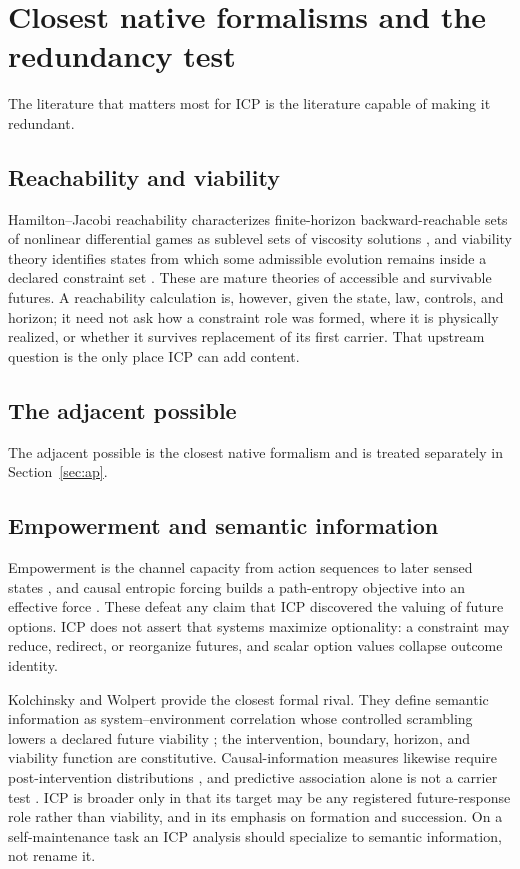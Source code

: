 \section{Closest native formalisms and the redundancy test}
\label{sec:redundancy}

The literature that matters most for ICP is the literature capable of making
it redundant.

\subsection{Reachability and viability}

Hamilton--Jacobi reachability characterizes finite-horizon backward-reachable
sets of nonlinear differential games as sublevel sets of viscosity solutions
\citep{MitchellEtAl2005Reachable}, and viability theory identifies states from
which some admissible evolution remains inside a declared constraint set
\citep{SaintPierre1994Viability}. These are mature theories of accessible and
survivable futures. A reachability calculation is, however, given the state,
law, controls, and horizon; it need not ask how a constraint role was formed,
where it is physically realized, or whether it survives replacement of its
first carrier. That upstream question is the only place ICP can add content.

\subsection{The adjacent possible}

The adjacent possible is the closest native formalism and is treated
separately in Section~\ref{sec:ap}.

\subsection{Empowerment and semantic information}

Empowerment is the channel capacity from action sequences to later sensed
states \citep{KlyubinEtAl2005Empowerment}, and causal entropic forcing builds a
path-entropy objective into an effective force
\citep{WissnerGrossFreer2013CausalEntropy}. These defeat any claim that ICP
discovered the valuing of future options. ICP does not assert that systems
maximize optionality: a constraint may reduce, redirect, or reorganize
futures, and scalar option values collapse outcome identity.

Kolchinsky and Wolpert provide the closest formal rival. They define semantic
information as system--environment correlation whose controlled scrambling
lowers a declared future viability \citep{KolchinskyWolpert2018Semantic}; the
intervention, boundary, horizon, and viability function are constitutive.
Causal-information measures likewise require post-intervention distributions
\citep{AyPolani2008InformationFlows}, and predictive association alone is not a
carrier test \citep{JamesEtAl2016InformationFlows}. ICP is broader only in that
its target may be any registered future-response role rather than viability,
and in its emphasis on formation and succession. On a self-maintenance task an
ICP analysis should specialize to semantic information, not rename it.

